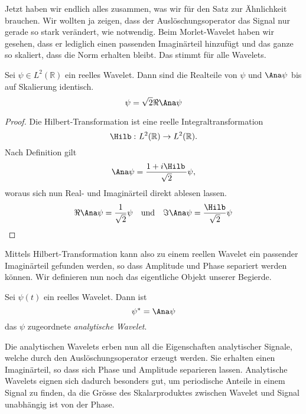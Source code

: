 Jetzt haben wir endlich alles zusammen, was wir für den Satz zur Ähnlichkeit brauchen.
Wir wollten ja zeigen, dass der Auslöschungsoperator das Signal nur gerade so stark verändert, wie notwendig.
Beim Morlet-Wavelet haben wir gesehen, dass er lediglich einen passenden Imaginärteil hinzufügt und das ganze so skaliert, dass die Norm erhalten bleibt.
Das stimmt für alle Wavelets.

\begin{satz}
	Sei $\psi \in L^2(\mathbb R)$ ein reelles Wavelet. Dann sind die Realteile von $\psi$ und $\Ana\psi$ bis auf Skalierung identisch.
	\[ \psi = \sqrt 2 \Re\Ana\psi\]
\end{satz}

\begin{proof}
	Die Hilbert-Transformation ist eine reelle Integraltransformation
	\[\Hilb\,\colon L^2(\mathbb{R}) \to L^2(\mathbb{R}).\]
	Nach Definition gilt
	\[\Ana\psi = \frac{1 + i\Hilb\,}{\sqrt 2}\psi,\]
	woraus sich nun Real- und Imaginärteil direkt ablesen lassen.
	\[\Re \Ana\psi = \frac{1}{\sqrt 2}\psi \quad \text{und}\quad \Im \Ana\psi = \frac{\Hilb }{\sqrt 2}\psi\qedhere\]
\end{proof}

Mittels Hilbert-Transformation kann also zu einem reellen Wavelet ein passender Imaginärteil gefunden werden, so dass Amplitude und Phase separiert werden können.
Wir definieren nun noch das eigentliche Objekt unserer Begierde.

\begin{satz}
	\label{complex:analytic-wavelet}
	Sei $\psi(t)$ ein reelles Wavelet. Dann ist
	\begin{equation}
	\psi^\ast = \Ana\psi
	\end{equation}
	das $\psi$ zugeordnete \emph{analytische Wavelet}.
\end{satz}

Die analytischen Wavelets erben nun all die Eigenschaften analytischer Signale, welche durch den Auslöschungsoperator erzeugt werden.
Sie erhalten einen Imaginärteil, so dass sich Phase und Amplitude separieren lassen.
Analytische Wavelets eignen sich dadurch besonders gut, um periodische Anteile in einem Signal zu finden, da die Grösse des Skalarproduktes zwischen Wavelet und Signal unabhängig ist von der Phase.
